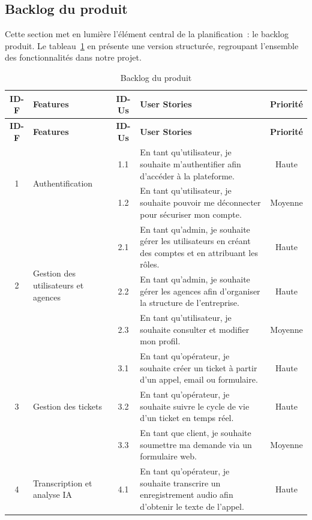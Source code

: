 \subsection{Backlog du produit}

Cette section met en lumi\`{e}re l'\'{e}l\'{e}ment central de la planification~: le backlog produit. Le tableau~\ref{tab:backlog} en pr\'{e}sente une version structur\'{e}e, regroupant l'ensemble des fonctionnalit\'{e}s dans notre projet.

\begin{longtable}{|c|p{2.5cm}|c|p{5.8cm}|c|}
\caption{Backlog du produit} \label{tab:backlog} \\
\hline
\textbf{ID-F} & \textbf{Features} & \textbf{ID-Us} & \textbf{User Stories} & \textbf{Priorit\'{e}} \\
\hline
\endfirsthead
\hline \textbf{ID-F} & \textbf{Features} & \textbf{ID-Us} & \textbf{User Stories} & \textbf{Priorit\'{e}} \\ \hline
\endhead
\multirow{2}{*}{1} & \multirow{2}{2.8cm}{Authentification} & 1.1 & En tant qu'utilisateur, je souhaite m'authentifier afin d'acc\'{e}der \`{a} la plateforme. & Haute \\
\cline{3-5}
 & & 1.2 & En tant qu'utilisateur, je souhaite pouvoir me d\'{e}connecter pour s\'{e}curiser mon compte. & Moyenne \\
\hline
\multirow{3}{*}{2} & \multirow{3}{2.8cm}{Gestion des utilisateurs et agences} & 2.1 & En tant qu'admin, je souhaite g\'{e}rer les utilisateurs en cr\'{e}ant des comptes et en attribuant les r\^{o}les. & Haute \\
\cline{3-5}
 & & 2.2 & En tant qu'admin, je souhaite g\'{e}rer les agences afin d'organiser la structure de l'entreprise. & Haute \\
\cline{3-5}
 & & 2.3 & En tant qu'utilisateur, je souhaite consulter et modifier mon profil. & Moyenne \\
\hline
\multirow{3}{*}{3} & \multirow{3}{2.8cm}{Gestion des tickets} & 3.1 & En tant qu'op\'{e}rateur, je souhaite cr\'{e}er un ticket \`{a} partir d'un appel, email ou formulaire. & Haute \\
\cline{3-5}
 & & 3.2 & En tant qu'op\'{e}rateur, je souhaite suivre le cycle de vie d'un ticket en temps r\'{e}el. & Haute \\
\cline{3-5}
 & & 3.3 & En tant que client, je souhaite soumettre ma demande via un formulaire web. & Moyenne \\
\hline
\multirow{2}{*}{4} & \multirow{2}{2.8cm}{Transcription et analyse IA} & 4.1 & En tant qu'op\'{e}rateur, je souhaite transcrire un enregistrement audio afin d'obtenir le texte de l'appel. & Haute \\

\end{longtable}
